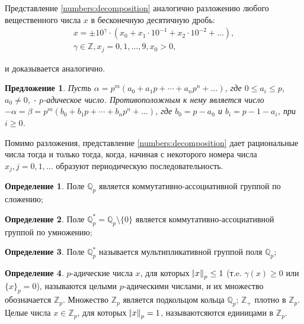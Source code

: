 \documentclass[master, och, diploma, times]{sty/SCWorks}
\theoremstyle{plain}
\newtheorem{proposition}{Предложение}[section]
\theoremstyle{definition}
\newtheorem{defn}{Определение}[section]
\numberwithin{equation}{section}
\begin{document}
Представление \eqref{numbers:decomposition} аналогично разложению любого вещественного числа $x$ в бесконечную десятичную дробь:
\begin{equation}
\begin{aligned}
	x=\pm10^\gamma \cdot (x_0 + x_1 \cdot 10^{-1} + x_2 \cdot 10^{-2} + \dots),\\
	\gamma \in \mathbb {Z}, x_j = 0, 1, \dots, 9, x_0 > 0,
\end{aligned}
\end{equation}

\noindent и доказывается аналогично.

\begin{proposition}
Пусть $\alpha=p^m(a_0+a_1p+\cdots +a_np^n+\dots)$, где $0 \le a_i \le p$, $a_0 \neq 0$, - $p$-адическое число. Противоположным к нему является число $- \alpha=\beta=p^m(b_0+b_1p+\cdots+b_np^n+\dots)$, где $b_0=p-a_0$ и $b_i=p-1-a_i$, при $i \geq 0$.
\end{proposition}\label{adic:pros:minus}

Помимо разложения, представление \eqref{numbers:decomposition} дает рациональные числа тогда и только тогда, когда, начиная с некоторого номера числа $x_j, j=0,1,\dots$ образуют периодическую последовательность.

\begin{defn}
Поле $\mathbb {Q}_p$ является коммутативно-ассоциативной группой по сложению;
\end{defn}

\begin{defn}
Поле $\mathbb {Q}_p^*=\mathbb {Q}_p \setminus \{0\}$ является коммутативно-ассоциативной группой по умножению;
\end{defn}

\begin{defn}
Поле $\mathbb {Q}_p^*$ называется мультипликативной группой поля $\mathbb {Q}_p$\cite{bib:analysis:baker};
\end{defn}

\begin{defn}
$p$-адические числа $x$, для которых $\norm{x}_p \le 1$ (т.e. $\gamma(x) \ge 0$ или $\{x\}_p=0$), называются целыми $p$-адическими числами, и их множество обозначается $\mathbb {Z}_p$. Множество $\mathbb {Z}_p$ является подкольцом кольца $\mathbb {Q}_p$; $\mathbb {Z}_+$ плотно в $\mathbb {Z}_p$. Целые числа $x \in \mathbb {Z}_p$, для которых $\norm{x}_p=1$, называютсяются единицами в $\mathbb {Z}_p$. \cite{bib:analysis:vladimirov}
\end{defn}
\end{document}
